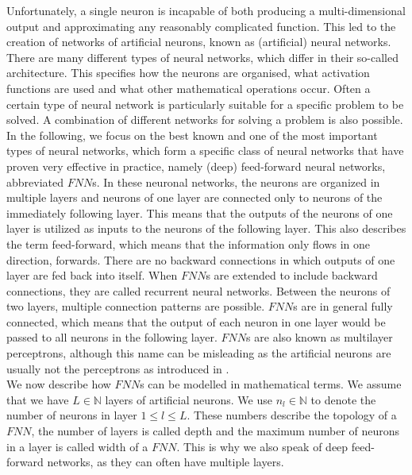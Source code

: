 Unfortunately, a single neuron is incapable of both producing a multi-dimensional output and approximating any reasonably complicated function. This led to the creation of networks of artificial neurons, known as (artificial) neural networks. There are many different types of neural networks, which differ in their so-called architecture. This specifies how the neurons are organised, what activation functions are used and what other mathematical operations occur. Often a certain type of neural network is particularly suitable for a specific problem to be solved. A combination of different networks for solving a problem is also possible. \\
In the following, we focus on the best known and one of the most important types of neural networks, which form a specific class of neural networks that have proven very effective in practice, namely (deep) feed-forward neural networks, abbreviated $FNN$s. In these neuronal networks, the neurons are organized in multiple layers and neurons of one layer are connected only to neurons of the immediately following layer. This means that the outputs of the neurons of one layer is utilized as inputs to the neurons of the following layer. This also describes the term feed-forward, which means that the information only flows in one direction, forwards. There are no backward connections in which outputs of one layer are fed back into itself. When $FNN$s are extended to include backward connections, they are called recurrent neural networks. Between the neurons of two layers, multiple connection patterns are possible. $FNN$s are in general fully connected, which means that the output of each neuron in one layer would be passed to all neurons in the following layer. $FNN$s are also known as multilayer perceptrons, although this name can be misleading as the artificial neurons are usually not the perceptrons as introduced in \cite{Rosenblatt:1958}. \\
We now describe how $FNN$s can be modelled in mathematical terms. We assume that we have $L \in \mathbb{N}$ layers of artificial neurons. We use $n_l \in \mathbb{N}$ to denote the number of neurons in layer $1 \leq l \leq L$. These numbers describe the topology of a $FNN$, the number of layers is called depth and the maximum number of neurons in a layer is called width of a $FNN$. This is why we also speak of deep feed-forward networks, as they can often have multiple layers. \\
